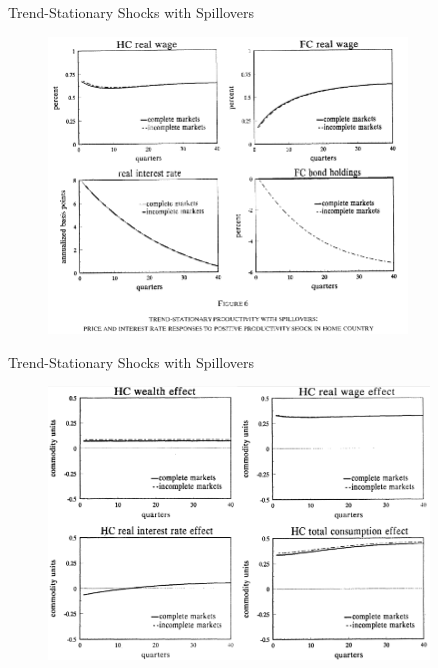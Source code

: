 \documentclass[10pt]{beamer}
\begin{document}
\begin{frame}{Trend-Stationary Shocks with Spillovers}
\begin{figure}[thbp]
  \centering
  \includegraphics[width=0.85\textwidth]{19.png}
\end{figure}
\end{frame}

\begin{frame}{Trend-Stationary Shocks with Spillovers}
\begin{figure}[thbp]
  \centering
  \includegraphics[width=0.90\textwidth]{20.png}
\end{figure}
\end{frame}
\end{document}
